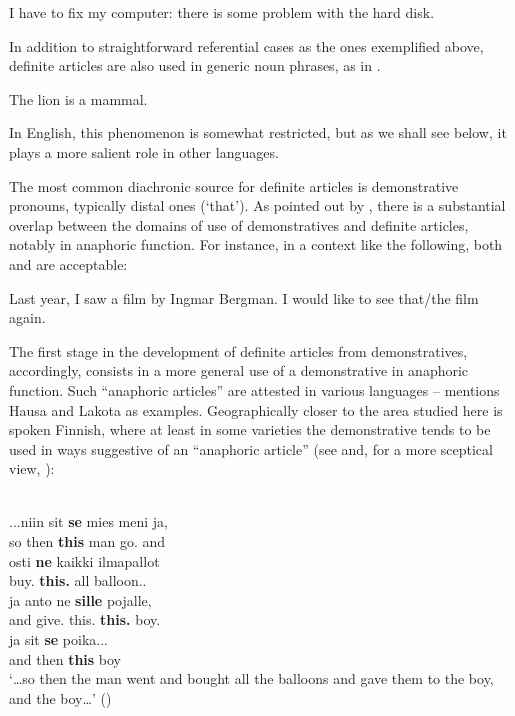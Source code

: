 \ea
	\gl	\label{bkm:Ref75942712}I have to fix my computer: there is some problem with the hard disk. 
\z 

In addition to straightforward referential cases as the ones exemplified above, definite articles are also used in generic noun phrases, as in . 

\ea 
	\gl	\label{bkm:Ref123549675}The lion is a mammal.
\z 

In English, this phenomenon is somewhat restricted, but as we shall see below, it plays a more salient role in other languages.

The most common diachronic source for definite articles is demonstrative pronouns, typically distal ones (‘that’). As pointed out by \citet[332]{Lyons1999}, there is a substantial overlap between the domains of use of demonstratives and definite articles, notably in anaphoric function. For instance, in a context like the following, both  and  are acceptable:

\ea 
	\gl Last year, I saw a film by Ingmar Bergman. I would like to see that/the film again.
\z 

The first stage in the development of definite articles from demonstratives, accordingly, consists in a more general use of a demonstrative in anaphoric function. Such “anaphoric articles” are attested in various languages – \citet[53-54]{Lyons1999} mentions Hausa and Lakota as examples. Geographically closer to the area studied here is spoken Finnish, where at least in some varieties the demonstrative tends to be used in ways suggestive of an “anaphoric article” (see \citet{Laury1997} and, for a more sceptical view, \citet{Juvonen2000}):

\ea\label{}
\\
\gll	...niin  sit  \textbf{se} mies  meni  ja,\\
		so  then  \textbf{this} man  go.{\pst}  and\\
\gll	osti  \textbf{ne} kaikki  ilmapallot\\
		buy.{\pst}  \textbf{this.{\pl}} all  balloon.{\nom}.{\pl}\\
\gll	ja  anto  ne  \textbf{sille} pojalle,\\
		and  give.{\pst}  this.{\pl}  \textbf{this.{\all}} boy.{\all}\\
		
\gll 	ja  sit  \textbf{se} poika...\\
		and then  \textbf{this} boy\\
\glt 	‘…so then the man went and bought all the balloons and gave them to the boy, and the boy…’ (\citet[136]{Juvonen2000})

